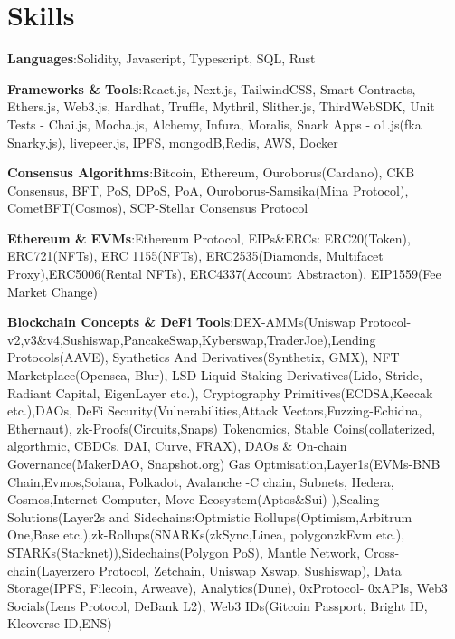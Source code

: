 \documentclass[letterpaper,11pt]{article}
\newcommand{\resumeSubHeadingListStart}{\begin{itemize}[leftmargin=0.15in, label={}]}
\newcommand{\resumeSubHeadingListEnd}{\end{itemize}}
\begin{document}
\section{Skills}
\vspace{2pt}
\resumeSubHeadingListStart
  \small{\item{
      \textbf{Languages}{:Solidity, Javascript, Typescript, SQL, Rust} \\ \vspace{3pt}
      
      \textbf{Frameworks \& Tools}{:React.js, Next.js, TailwindCSS, Smart Contracts, Ethers.js, Web3.js, Hardhat, Truffle, Mythril, Slither.js, ThirdWebSDK, Unit Tests - Chai.js, Mocha.js, Alchemy, Infura, Moralis, Snark Apps - o1.js(fka Snarky.js), livepeer.js, IPFS, mongodB,Redis, AWS, Docker } \\ \vspace{3pt}
      
      \textbf{Consensus Algorithms}{:Bitcoin, Ethereum, Ouroborus(Cardano), CKB Consensus, BFT, PoS, DPoS, PoA, Ouroborus-Samsika(Mina Protocol), CometBFT(Cosmos), SCP-Stellar Consensus Protocol}
      
      \textbf{Ethereum \& EVMs}{:Ethereum Protocol, EIPs\&ERCs: ERC20(Token), ERC721(NFTs), ERC 1155(NFTs), ERC2535(Diamonds, Multifacet Proxy),ERC5006(Rental NFTs), ERC4337(Account Abstracton), EIP1559(Fee Market Change)}

      \textbf{Blockchain Concepts \& DeFi Tools}{:DEX-AMMs(Uniswap Protocol-v2,v3\&v4,Sushiswap,PancakeSwap,Kyberswap,TraderJoe),Lending Protocols(AAVE), Synthetics And Derivatives(Synthetix, GMX), NFT Marketplace(Opensea, Blur), LSD-Liquid Staking Derivatives(Lido, Stride, Radiant Capital, EigenLayer etc.), Cryptography Primitives(ECDSA,Keccak etc.),DAOs,  DeFi Security(Vulnerabilities,Attack Vectors,Fuzzing-Echidna, Ethernaut), zk-Proofs(Circuits,Snaps) Tokenomics, Stable Coins(collaterized, algorthmic, CBDCs, DAI, Curve, FRAX), DAOs \& On-chain Governance(MakerDAO, Snapshot.org) Gas Optmisation,Layer1s(EVMs-BNB Chain,Evmos,Solana, Polkadot, Avalanche -C chain, Subnets, Hedera, Cosmos,Internet Computer, Move Ecosystem(Aptos\&Sui) ),Scaling Solutions(Layer2s and Sidechains:Optmistic Rollups(Optimism,Arbitrum One,Base etc.),zk-Rollups(SNARKs(zkSync,Linea, polygonzkEvm etc.), STARKs(Starknet)),Sidechains(Polygon PoS), Mantle Network, Cross-chain(Layerzero Protocol, Zetchain, Uniswap Xswap, Sushiswap), Data Storage(IPFS, Filecoin, Arweave), Analytics(Dune), 0xProtocol- 0xAPIs, Web3 Socials(Lens Protocol, DeBank L2), Web3 IDs(Gitcoin Passport, Bright ID, Kleoverse ID,ENS) }
      
     
  }}
\resumeSubHeadingListEnd
\end{document}
